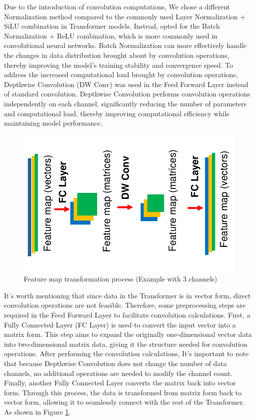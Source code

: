 \documentclass[12pt]{report}
\begin{document}
Due to the introduction of convolution computations, We chose a different Normalization method compared to the commonly used Layer Normalization + SiLU combination in Transformer models. Instead, opted for the Batch Normalization + ReLU combination, which is more commonly used in convolutional neural networks. Batch Normalization can more effectively handle the changes in data distribution brought about by convolution operations, thereby improving the model's training stability and convergence speed. To address the increased computational load brought by convolution operations, Depthwise Convolution (DW Conv) was used in the Feed Forward Layer instead of standard convolution. Depthwise Convolution performs convolution operations independently on each channel, significantly reducing the number of parameters and computational load, thereby improving computational efficiency while maintaining model performance.

\begin{figure}[thbp]
    \centering
    \includegraphics[width=14cm]{image/FFL1.pdf}
    \caption{Feature map transformation process (Example with 3 channels)}
    \label{fig:FFL1}
\end{figure}

It's worth mentioning that since data in the Transformer is in vector form, direct convolution operations are not feasible. Therefore, some preprocessing steps are required in the Feed Forward Layer to facilitate convolution calculations. First, a Fully Connected Layer (FC Layer) is used to convert the input vector into a matrix form. This step aims to expand the originally one-dimensional vector data into two-dimensional matrix data, giving it the structure needed for convolution operations. After performing the convolution calculations, It's important to note that because Depthwise Convolution does not change the number of data channels, no additional operations are needed to modify the channel count. Finally, another Fully Connected Layer converts the matrix back into vector form. Through this process, the data is transformed from matrix form back to vector form, allowing it to seamlessly connect with the rest of the Transformer. As shown in Figure \ref{fig:FFL1}.
\end{document}
